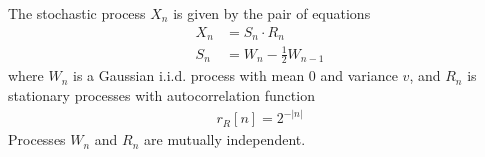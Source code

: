 The stochastic process  $X_n$ is given by the  pair of equations
\begin{align*}
X_n &= S_n \cdot R_n   \\
S_n &= W_n - \frac12 W_{n-1}
\end{align*}
where $W_n$ is a Gaussian i.i.d. process with mean $0$ and variance $v$, and $R_n$ is stationary processes with autocorrelation function
\begin{align*}
r_R[n] = 2^{-|n|} 
\end{align*}
Processes $W_n$ and $R_n$ are mutually independent.

